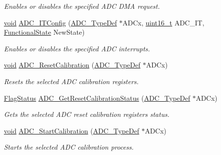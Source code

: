 \begin{DoxyCompactItemize}
\begin{DoxyCompactList}\small\item\em Enables or disables the specified A\+DC D\+MA request. \end{DoxyCompactList}\item 
\hyperlink{usb__devapi_8h_afabf60e7f57651d6d595a02c75f07cd0}{void} \hyperlink{group___a_d_c___private___functions_gad4c84b54b539944f555488bf979f82b6}{A\+D\+C\+\_\+\+I\+T\+Config} (\hyperlink{struct_a_d_c___type_def}{A\+D\+C\+\_\+\+Type\+Def} $\ast$A\+D\+Cx, \hyperlink{_p_e___types_8h_a1f1825b69244eb3ad2c7165ddc99c956}{uint16\+\_\+t} A\+D\+C\+\_\+\+IT, \hyperlink{agilefox_2library_2inc_2stm32f10x__type_8h_ac9a7e9a35d2513ec15c3b537aaa4fba1}{Functional\+State} New\+State)
\begin{DoxyCompactList}\small\item\em Enables or disables the specified A\+DC interrupts. \end{DoxyCompactList}\item 
\hyperlink{usb__devapi_8h_afabf60e7f57651d6d595a02c75f07cd0}{void} \hyperlink{group___a_d_c___private___functions_ga3d542020ba28c1d16238a0defbee6d8f}{A\+D\+C\+\_\+\+Reset\+Calibration} (\hyperlink{struct_a_d_c___type_def}{A\+D\+C\+\_\+\+Type\+Def} $\ast$A\+D\+Cx)
\begin{DoxyCompactList}\small\item\em Resets the selected A\+DC calibration registers. \end{DoxyCompactList}\item 
\hyperlink{agilefox_2library_2inc_2stm32f10x__type_8h_a89136caac2e14c55151f527ac02daaff}{Flag\+Status} \hyperlink{group___a_d_c___private___functions_ga113be9fe25add8d7496bed659c68e02b}{A\+D\+C\+\_\+\+Get\+Reset\+Calibration\+Status} (\hyperlink{struct_a_d_c___type_def}{A\+D\+C\+\_\+\+Type\+Def} $\ast$A\+D\+Cx)
\begin{DoxyCompactList}\small\item\em Gets the selected A\+DC reset calibration registers status. \end{DoxyCompactList}\item 
\hyperlink{usb__devapi_8h_afabf60e7f57651d6d595a02c75f07cd0}{void} \hyperlink{group___a_d_c___private___functions_gadcba6341124a6aabfd2dd885ca8e5f14}{A\+D\+C\+\_\+\+Start\+Calibration} (\hyperlink{struct_a_d_c___type_def}{A\+D\+C\+\_\+\+Type\+Def} $\ast$A\+D\+Cx)
\begin{DoxyCompactList}\small\item\em Starts the selected A\+DC calibration process. \end{DoxyCompactList}\item 

\end{DoxyCompactItemize}
